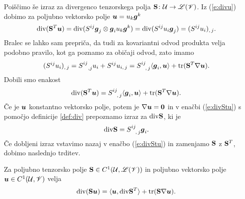Poiščimo še izraz za divergenco tenzorskega polja $\mathbf S\colon \mathcal U\to\mathscr L(\mathscr V)$.
Iz (\ref{e:divu}) dobimo za poljubno vektorsko polje $\boldsymbol u=u_k\boldsymbol g^k$
\[
	\mathrm{div}(\mathbf S^{T}\boldsymbol u)=\mathrm{div}(S^{ij}\boldsymbol g_j\otimes\boldsymbol g_i u_k\boldsymbol g^k)
	=\mathrm{div}(S^{ij}u_i\boldsymbol g_j)=(S^{ij}u_i)_{,\,j}.
\]
Bralec se lahko sam prepriča, da tudi za kovariantni odvod produkta velja
podobno pravilo, kot ga poznamo za običaji odvod, zato imamo
\[
	(S^{ij}u_i)_{,\,j}=\topbot{S}{ij}{\,,j}u_i+S^{ij}u_{i,\,j}=
	\topbot{S}{ij}{,\,j}\langle\vek{g}_i,\vek{u}\rangle+\tr(\ten{S}^{T}\nabla\vek{u}).
\]
Dobili smo enakost
\begin{equation} \label{e:divStu}
	\div(\ten{S}^{T}\vek{u})=\topbot{S}{ij}{,\,j}\langle\vek{g}_i,\vek{u}\rangle+\tr(\ten{S}^{T}\nabla\vek{u}).
\end{equation}
Če je $\boldsymbol u$ konstantno vektorsko polje, potem je $\nabla\boldsymbol u=\mathbf 0$ in v
enačbi (\ref{e:divStu}) s pomočjo definicije \ref{def:div} prepoznamo izraz za $\mathrm{div}\mathbf S$, ki je
\[
	\div\ten{S}=\topbot{S}{ij}{,\,j}\vek{g}_i.
\]
Če dobljeni izraz vstavimo nazaj v enačbo (\ref{e:divStu}) in zamenjamo $\mathbf S$ z
$\mathbf S^{T}$, dobimo naslednjo trditev.
\begin{trditev} \label{e:divSu}
	Za poljubno tenzorsko polje $\mathbf S\in C^1(\mathcal U,\mathscr L(\mathscr V))$ in poljubno
	vektorsko polje $\boldsymbol u\in C^1(\mathcal U,\mathscr V)$ velja
	\[ \mathrm{div}(\mathbf S\boldsymbol u)=\langle\boldsymbol u,\mathrm{div}\mathbf S^{T}\rangle+\mathrm{tr}(\mathbf S\nabla\boldsymbol u). \]
\end{trditev}